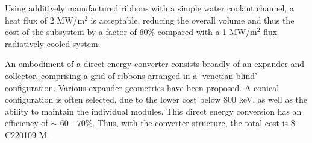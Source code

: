 Using additively manufactured ribbons with a simple water coolant channel, a heat flux of 2 MW/m$^2$ is acceptable, reducing the overall volume and thus the cost of the subsystem by a factor of 60\% compared with a 1 MW/m$^2$ flux radiatively-cooled system.\\


\begin{table}[ht]
    \centering
    \caption{Costs for the direct energy convertor subsystems.}
    \label{tab:cost-table}
\end{table}

An embodiment of a direct energy converter consists broadly of an expander and collector, comprising a grid of ribbons arranged in a `venetian blind' configuration.
Various expander geometries have been proposed.
A conical configuration is often selected, due to the lower cost below 800 keV, as well as the ability to maintain the individual modules.
This direct energy conversion has an efficiency of $\sim$ 60 - 70\%.
Thus, with the converter structure, the total cost is \$ C220109 M.
